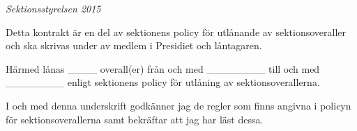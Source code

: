 \documentclass{dtek}
\begin{document}
\vspace{1cm}

\emph{Sektionsstyrelsen 2015}

\vspace{5mm}

Detta kontrakt är en del av sektionens policy för utlånande av sektionsoveraller och ska skrivas under av medlem i Presidiet och låntagaren.

Härmed lånas \_\_\_\_ overall(er) från och med \_\_\_\_\_\_\_\_ till och med \_\_\_\_\_\_\_\_ enligt sektionens policy för utlåning av sektionsoverallerna.

I och med denna underskrift godkänner jag de regler som finns angivna i policyn för sektionsoverallerna samt bekräftar att jag har läst dessa.

 \\
 \\
\end{document}
